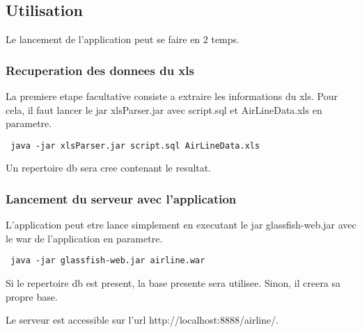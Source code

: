 \subsection{Utilisation}
Le lancement de l'application peut se faire en 2 temps.
\subsubsection{Recuperation des donnees du xls}
La premiere etape facultative consiste a extraire les informations du xls. Pour cela, il faut lancer le jar xlsParser.jar avec script.sql et AirLineData.xls en parametre. 
\begin{verbatim}
 java -jar xlsParser.jar script.sql AirLineData.xls
\end{verbatim}
Un repertoire db sera cree contenant le resultat.
\subsubsection{Lancement du serveur avec l'application}
L'application peut etre lance simplement en executant le jar glassfish-web.jar avec le war de l'application en parametre. 
\begin{verbatim}
 java -jar glassfish-web.jar airline.war
\end{verbatim}
Si le repertoire db est present, la base presente sera utilisee. Sinon, il creera sa propre base.

Le serveur est accessible sur l'url http://localhost:8888/airline/. 